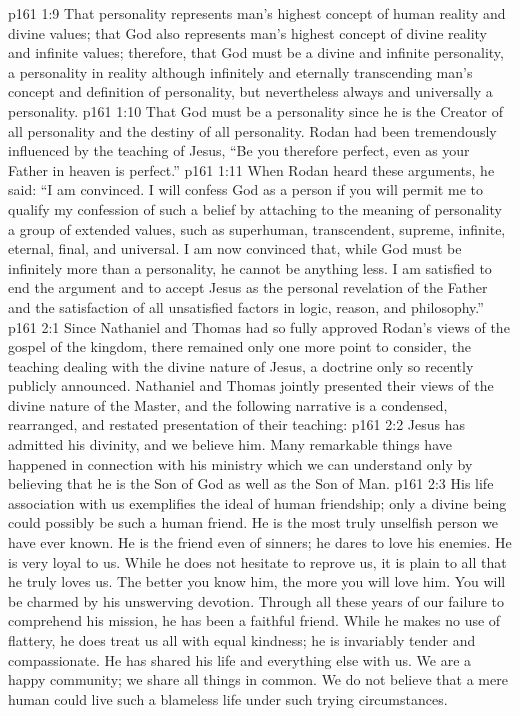 \vs p161 1:9 \pc {}\bibnobreakspace That personality represents man’s highest concept of human reality and divine values; that God also represents man’s highest concept of divine reality and infinite values; therefore, that God must be a divine and infinite personality, a personality in reality although infinitely and eternally transcending man’s concept and definition of personality, but nevertheless always and universally a personality.
\vs p161 1:10 \pc {}\bibnobreakspace That God must be a personality since he is the Creator of all personality and the destiny of all personality. Rodan had been tremendously influenced by the teaching of Jesus, \textcolor{ubdarkred}{“Be you therefore perfect, even as your Father in heaven is perfect.”}
\vs p161 1:11 \pc When Rodan heard these arguments, he said: “I am convinced. I will confess God as a person if you will permit me to qualify my confession of such a belief by attaching to the meaning of personality a group of extended values, such as superhuman, transcendent, supreme, infinite, eternal, final, and universal. I am now convinced that, while God must be infinitely more than a personality, he cannot be anything less. I am satisfied to end the argument and to accept Jesus as the personal revelation of the Father and the satisfaction of all unsatisfied factors in logic, reason, and philosophy.”
\vs p161 2:1 Since Nathaniel and Thomas had so fully approved Rodan’s views of the gospel of the kingdom, there remained only one more point to consider, the teaching dealing with the divine nature of Jesus, a doctrine only so recently publicly announced. Nathaniel and Thomas jointly presented their views of the divine nature of the Master, and the following narrative is a condensed, rearranged, and restated presentation of their teaching:
\vs p161 2:2 \bibnobreakspace Jesus has admitted his divinity, and we believe him. Many remarkable things have happened in connection with his ministry which we can understand only by believing that he is the Son of God as well as the Son of Man.
\vs p161 2:3 \pc {}\bibnobreakspace His life association with us exemplifies the ideal of human friendship; only a divine being could possibly be such a human friend. He is the most truly unselfish person we have ever known. He is the friend even of sinners; he dares to love his enemies. He is very loyal to us. While he does not hesitate to reprove us, it is plain to all that he truly loves us. The better you know him, the more you will love him. You will be charmed by his unswerving devotion. Through all these years of our failure to comprehend his mission, he has been a faithful friend. While he makes no use of flattery, he does treat us all with equal kindness; he is invariably tender and compassionate. He has shared his life and everything else with us. We are a happy community; we share all things in common. We do not believe that a mere human could live such a blameless life under such trying circumstances.
